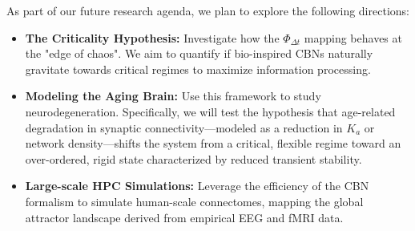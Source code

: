 \documentclass[10pt, conference]{IEEEtran}
\begin{document}
As part of our future research agenda, we plan to explore the following directions:
\begin{itemize}
    \item \textbf{The Criticality Hypothesis:} Investigate how the $\Phi_{\Delta t}$ mapping behaves at the "edge of chaos". We aim to quantify if bio-inspired CBNs naturally gravitate towards critical regimes to maximize information processing.
    \item \textbf{Modeling the Aging Brain:} Use this framework to study neurodegeneration. Specifically, we will test the hypothesis that age-related degradation in synaptic connectivity---modeled as a reduction in $K_a$ or network density---shifts the system from a critical, flexible regime toward an over-ordered, rigid state characterized by reduced transient stability.
    \item \textbf{Large-scale HPC Simulations:} Leverage the efficiency of the CBN formalism to simulate human-scale connectomes, mapping the global attractor landscape derived from empirical EEG and fMRI data.
\end{itemize}



\end{document}
